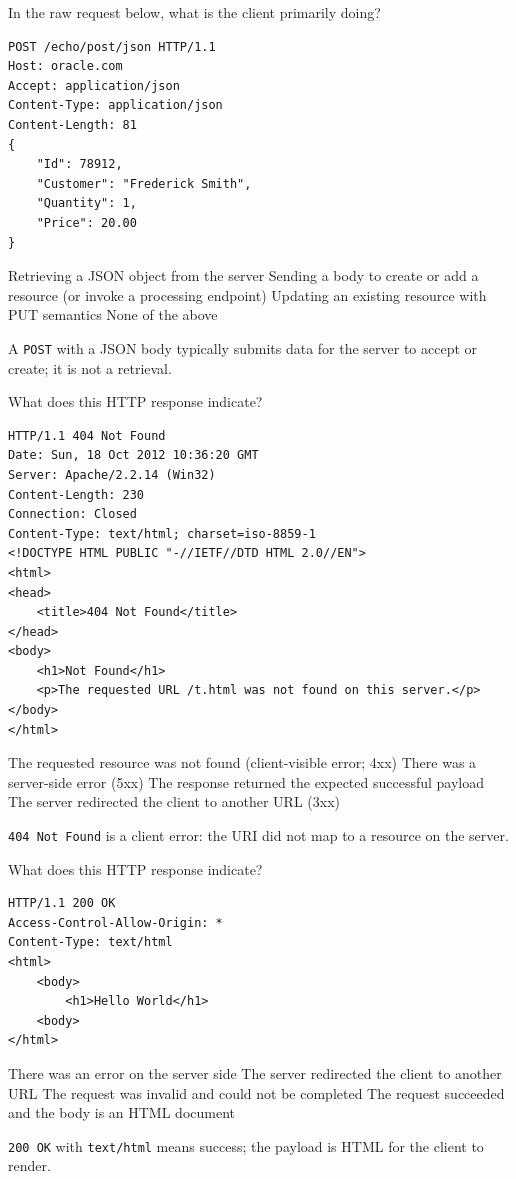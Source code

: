 \newpage

\question[4]
In the raw request below, what is the client primarily doing?
\begin{lstlisting}[style=http]
POST /echo/post/json HTTP/1.1
Host: oracle.com
Accept: application/json
Content-Type: application/json
Content-Length: 81
{
    "Id": 78912,
    "Customer": "Frederick Smith",
    "Quantity": 1,
    "Price": 20.00
}
\end{lstlisting}
\begin{choices}
  \choice Retrieving a JSON object from the server
  \CorrectChoice Sending a body to create or add a resource (or invoke a processing endpoint)
  \choice Updating an existing resource with PUT semantics
  \choice None of the above
\end{choices}
\begin{solution}
  A \texttt{POST} with a JSON body typically submits data for the server to accept or create; it is not a retrieval.
\end{solution}



\question[4]
What does this HTTP response indicate?
\begin{lstlisting}[style=http]
HTTP/1.1 404 Not Found
Date: Sun, 18 Oct 2012 10:36:20 GMT
Server: Apache/2.2.14 (Win32)
Content-Length: 230
Connection: Closed
Content-Type: text/html; charset=iso-8859-1
<!DOCTYPE HTML PUBLIC "-//IETF//DTD HTML 2.0//EN">
<html>
<head>
    <title>404 Not Found</title>
</head>
<body>
    <h1>Not Found</h1>
    <p>The requested URL /t.html was not found on this server.</p>
</body>
</html>
\end{lstlisting}
\begin{choices}
  \CorrectChoice The requested resource was not found (client-visible error; 4xx)
  \choice There was a server-side error (5xx)
  \choice The response returned the expected successful payload
  \choice The server redirected the client to another URL (3xx)
\end{choices}
\begin{solution}
  \texttt{404 Not Found} is a client error: the URI did not map to a resource on the server.
\end{solution}


\newpage

\question[4]
What does this HTTP response indicate?
\begin{lstlisting}[style=http]
HTTP/1.1 200 OK
Access-Control-Allow-Origin: *
Content-Type: text/html
<html>
    <body>
        <h1>Hello World</h1>
    <body>
</html>
\end{lstlisting}
\begin{choices}
  \choice There was an error on the server side
  \choice The server redirected the client to another URL
  \choice The request was invalid and could not be completed
  \CorrectChoice The request succeeded and the body is an HTML document
\end{choices}
\begin{solution}
  \texttt{200 OK} with \texttt{text/html} means success; the payload is HTML for the client to render.
\end{solution}

